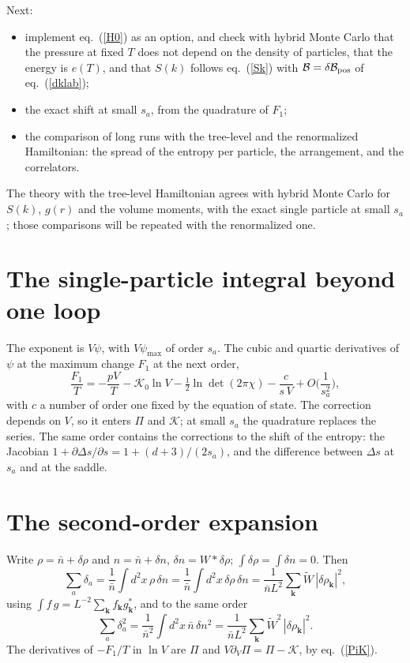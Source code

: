 \documentclass[11pt,aps,preprint,nofootinbib,superscriptaddress,tightenlines]{revtex4-2}
\newcommand{\klab}{\mathcal B}
\def\st{\begin{equation}}
\def\stp{\end{equation}}
\def\Eq#1{eq.~(\ref{#1})}
\begin{document}
Next:
\begin{itemize}
\item implement \Eq{H0} as an option, and check with hybrid Monte Carlo that the pressure at fixed $T$ does not depend on the density of particles, that the energy is $e(T)$,
  and that $S(k)$ follows \Eq{Sk} with $\klab=\delta\klab_{\rm pos}$ of \Eq{dklab};
\item the exact shift at small $s_a$, from the quadrature of $F_1$;
\item the comparison of long runs with the tree-level and the renormalized Hamiltonian: the spread of the entropy per particle, the arrangement, and the correlators.
\end{itemize}
The theory with the tree-level Hamiltonian agrees with hybrid Monte Carlo for $S(k)$, $g(r)$ and the volume moments, with the exact single particle at small $s_a$;
those comparisons will be repeated with the renormalized one.

\appendix

\section{The single-particle integral beyond one loop}
\label{app:single}

The exponent is $V\psi$, with $V\psi_{\max}$ of order $s_a$.  The cubic and quartic derivatives of $\psi$ at the maximum change $F_1$ at the next order,
\st
\frac{F_1}T=-\frac{pV}T-\mathcal K_0\ln V-\tfrac12\ln\det(2\pi\chi)-\frac{c}{s\,V}+O\Big(\frac1{s_a^2}\Big),
\stp
with $c$ a number of order one fixed by the equation of state.  The correction depends on $V$, so it enters $\Pi$ and $\mathcal K$; at small $s_a$ the quadrature replaces
the series.  The same order contains the corrections to the shift of the entropy: the Jacobian $1+\partial\Delta s/\partial s=1+(d+3)/(2s_a)$, and the difference between
$\Delta s$ at $s_a$ and at the saddle.

\section{The second-order expansion}
\label{app:second}

Write $\rho=\bar n+\delta\rho$ and $n=\bar n+\delta n$, $\delta n=W*\delta\rho$; $\int\delta\rho=\int\delta n=0$.  Then
\st
\sum_a\delta_a=\frac1{\bar n}\int d^2x\,\rho\,\delta n=\frac1{\bar n}\int d^2x\,\delta\rho\,\delta n=\frac1{\bar nL^2}\sum_{\bm k}\widetilde W\,|\delta\rho_{\bm k}|^2 ,
\stp
using $\int f\,g=L^{-2}\sum_{\bm k}f_{\bm k}g_{\bm k}^*$, and to the same order
\st
\sum_a\delta_a^2=\frac1{\bar n^2}\int d^2x\,\bar n\,\delta n^2=\frac1{\bar nL^2}\sum_{\bm k}\widetilde W^2\,|\delta\rho_{\bm k}|^2 .
\stp
The derivatives of $-F_1/T$ in $\ln V$ are $\Pi$ and $V\partial_V\Pi=\Pi-\mathcal K$, by \Eq{PiK}.
\end{document}
